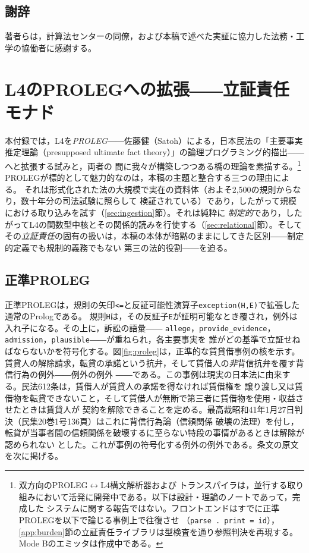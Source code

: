 \documentclass[11pt,a4paper]{ltjsarticle}
\newcommand{\code}[1]{\texttt{\small #1}}
\begin{document}
\subsection*{謝辞}
著者らは，計算法センターの同僚，および本稿で述べた実証に協力した法務・工学の協働者に感謝する。

\appendix
\section{L4のPROLEGへの拡張――立証責任モナド}\label{app:proleg}

本付録では，L4を\emph{PROLEG}\cite{satoh2011proleg}――佐藤健（Satoh）による，日本民法の「主要事実
推定理論（presupposed ultimate fact theory）」の論理プログラミング的描出――へと拡張する試みと，両者の
間に我々が構築しつつある橋の理論を素描する。\footnote{双方向のPROLEG$\leftrightarrow$L4構文解析器および
トランスパイラは，並行する取り組みにおいて活発に開発中である。以下は設計・理論のノートであって，完成した
システムに関する報告ではない。フロントエンドはすでに正準PROLEGを以下で論じる事例上で往復させ
（\code{parse . print = id}），\ref{app:burden}節の立証責任ライブラリは型検査を通り参照判決を再現する。
Mode Bのエミッタは作成中である。}　PROLEGが標的として魅力的なのは，本稿の主題と整合する三つの理由による。
それは形式化された法の大規模で実在の資料体（およそ2{,}500の規則からなり，数十年分の司法試験に照らして
検証されている）であり，したがって規模における取り込みを試す（\ref{sec:ingestion}節）。それは純粋に
\emph{制定的}であり，したがってL4の関数型中核とその関係的読みを行使する（\ref{sec:relational}節）。そして
その\emph{立証責任}の固有の扱いは，本稿の本体が暗黙のままにしてきた区別――制定的定義でも規制的義務でもない
第三の法的役割――を迫る。

\subsection{正準PROLEG}
正準PROLEGは，規則の矢印\code{<=}と反証可能性演算子\code{exception(H,E)}で拡張した通常のPrologである。
規則\code{H}は，その反証子\code{E}が証明可能なとき覆され，例外は入れ子になる。その上に，訴訟の語彙――
\code{allege}，\code{provide\_evidence}，\code{admission}，\code{plausible}――が重ねられ，各主要事実を
誰がどの基準で立証せねばならないかを符号化する。図\ref{fig:proleg}は，正準的な賃貸借事例の核を示す。
賃貸人の解除請求，転貸の承諾という抗弁，そして賃借人の\emph{非}背信抗弁を覆す背信行為の例外――例外の例外
――である。この事例は現実の日本法に由来する。民法612条は，賃借人が賃貸人の承諾を得なければ賃借権を
譲り渡し又は賃借物を転貸できないこと，そして賃借人が無断で第三者に賃借物を使用・収益させたときは賃貸人が
契約を解除できることを定める。最高裁昭和41年1月27日判決（民集20巻1号136頁）はこれに背信行為論（信頼関係
破壊の法理）を付し，転貸が当事者間の信頼関係を破壊するに至らない特段の事情があるときは解除が認められない
とした。これが事例の符号化する例外の例外である。条文の原文を次に掲げる。
\end{document}
